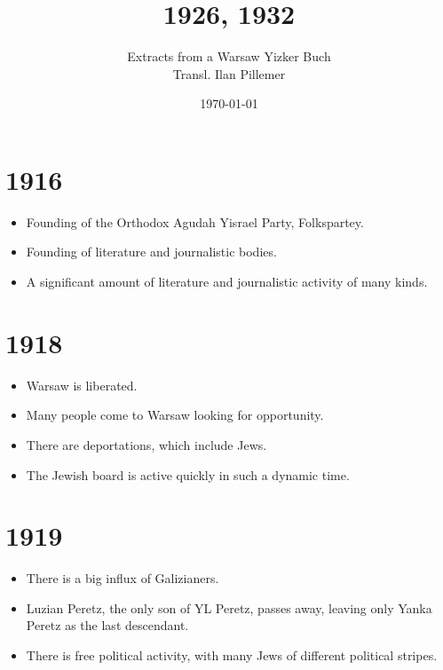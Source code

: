 \documentclass{article}
\begin{document}
\renewcommand{\abstractname}{\vspace{-\baselineskip}}
\title{1926, 1932}
\author{Extracts from a Warsaw Yizker Buch \\ Transl. Ilan Pillemer}
\date{\today}

\maketitle

\section{ 1916  }
\begin{itemize}
\item Founding of the Orthodox Agudah Yisrael Party, Folkspartey.
\item Founding of literature and journalistic bodies.
\item A significant amount of  literature and journalistic activity of many kinds.
\end{itemize}

\section{ 1918 }
\begin{itemize}
\item Warsaw is liberated.
\item Many people come to Warsaw looking for opportunity.
\item There are deportations, which include Jews.
\item The Jewish board is active quickly in such a dynamic time.
\end{itemize}
\section{ 1919 }
\begin{itemize}
\item There is a big influx of Galizianers.
\item Luzian Peretz, the only son of YL Peretz, passes away, leaving only Yanka Peretz as the last descendant.
\item There is free political activity, with many Jews of different political stripes.
\end{itemize}
\end{document}
